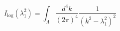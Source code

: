 \begin{equation}
I_{\log }(\lambda _{1}^{2})=\int_{\Lambda }\frac{d^{4}k}{(2\pi )^{4}}\frac{1%
}{(k^{2}-\lambda _{1}^{2})^{2}}  \label{93}
\end{equation}

